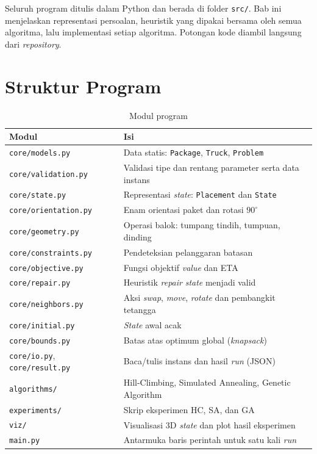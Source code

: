 Seluruh program ditulis dalam Python dan berada di folder \texttt{src/}. Bab ini
menjelaskan representasi persoalan, heuristik yang dipakai bersama oleh semua
algoritma, lalu implementasi setiap algoritma. Potongan kode diambil langsung dari
\textit{repository}.

\section{Struktur Program}

\begin{table}[H]
	\centering
	\caption{Modul program}
	\label{tab:modul}
	\begin{tabular}{l p{8.3cm}}
		\toprule
		\textbf{Modul} & \textbf{Isi} \\
		\midrule
		\texttt{core/models.py} & Data statis: \texttt{Package}, \texttt{Truck}, \texttt{Problem} \\
		\texttt{core/validation.py} & Validasi tipe dan rentang parameter serta data instans \\
		\texttt{core/state.py} & Representasi \textit{state}: \texttt{Placement} dan \texttt{State} \\
		\texttt{core/orientation.py} & Enam orientasi paket dan rotasi $90^\circ$ \\
		\texttt{core/geometry.py} & Operasi balok: tumpang tindih, tumpuan, dinding \\
		\texttt{core/constraints.py} & Pendeteksian pelanggaran batasan \\
		\texttt{core/objective.py} & Fungsi objektif \textit{value} dan ETA \\
		\texttt{core/repair.py} & Heuristik \textit{repair} \textit{state} menjadi valid \\
		\texttt{core/neighbors.py} & Aksi \textit{swap}, \textit{move}, \textit{rotate} dan pembangkit tetangga \\
		\texttt{core/initial.py} & \textit{State} awal acak \\
		\texttt{core/bounds.py} & Batas atas optimum global (\textit{knapsack}) \\
		\texttt{core/io.py}, \texttt{core/result.py} & Baca/tulis instans dan hasil \textit{run} (JSON) \\
		\texttt{algorithms/} & Hill-Climbing, Simulated Annealing, Genetic Algorithm \\
		\texttt{experiments/} & Skrip eksperimen HC, SA, dan GA \\
		\texttt{viz/} & Visualisasi 3D \textit{state} dan plot hasil eksperimen \\
		\texttt{main.py} & Antarmuka baris perintah untuk satu kali \textit{run} \\
		\bottomrule
	\end{tabular}
\end{table}

